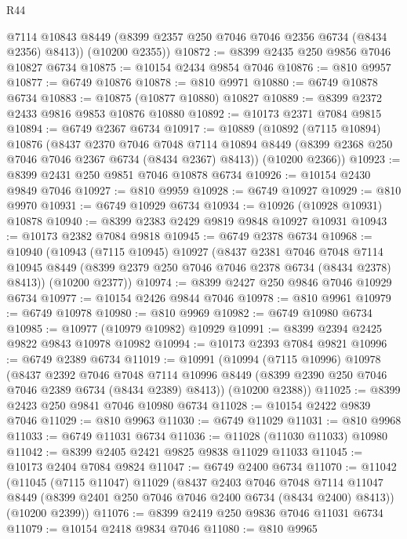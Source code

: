 \begin{lexlean}{R44}
\begin{coremodule}
{        @7114
        @10843
        @8449
        (@8399 @2357 @250 @7046 @7046 @2356 @6734 (@8434 @2356) @8413))
      (@10200 @2355))
@10872 := @8399 @2435 @250 @9856 @7046 @10827 @6734
@10875 := @10154 @2434 @9854 @7046
@10876 := @810 @9957
@10877 := @6749 @10876
@10878 := @810 @9971
@10880 := @6749 @10878 @6734
@10883 := @10875 (@10877 @10880) @10827
@10889 := @8399 @2372 @2433 @9816 @9853 @10876 @10880
@10892 := @10173 @2371 @7084 @9815
@10894 := @6749 @2367 @6734
@10917 := @10889
    (@10892
      (@7115 @10894)
      @10876
      (@8437
        @2370
        @7046
        @7048
        @7114
        @10894
        @8449
        (@8399 @2368 @250 @7046 @7046 @2367 @6734 (@8434 @2367) @8413))
      (@10200 @2366))
@10923 := @8399 @2431 @250 @9851 @7046 @10878 @6734
@10926 := @10154 @2430 @9849 @7046
@10927 := @810 @9959
@10928 := @6749 @10927
@10929 := @810 @9970
@10931 := @6749 @10929 @6734
@10934 := @10926 (@10928 @10931) @10878
@10940 := @8399 @2383 @2429 @9819 @9848 @10927 @10931
@10943 := @10173 @2382 @7084 @9818
@10945 := @6749 @2378 @6734
@10968 := @10940
    (@10943
      (@7115 @10945)
      @10927
      (@8437
        @2381
        @7046
        @7048
        @7114
        @10945
        @8449
        (@8399 @2379 @250 @7046 @7046 @2378 @6734 (@8434 @2378) @8413))
      (@10200 @2377))
@10974 := @8399 @2427 @250 @9846 @7046 @10929 @6734
@10977 := @10154 @2426 @9844 @7046
@10978 := @810 @9961
@10979 := @6749 @10978
@10980 := @810 @9969
@10982 := @6749 @10980 @6734
@10985 := @10977 (@10979 @10982) @10929
@10991 := @8399 @2394 @2425 @9822 @9843 @10978 @10982
@10994 := @10173 @2393 @7084 @9821
@10996 := @6749 @2389 @6734
@11019 := @10991
    (@10994
      (@7115 @10996)
      @10978
      (@8437
        @2392
        @7046
        @7048
        @7114
        @10996
        @8449
        (@8399 @2390 @250 @7046 @7046 @2389 @6734 (@8434 @2389) @8413))
      (@10200 @2388))
@11025 := @8399 @2423 @250 @9841 @7046 @10980 @6734
@11028 := @10154 @2422 @9839 @7046
@11029 := @810 @9963
@11030 := @6749 @11029
@11031 := @810 @9968
@11033 := @6749 @11031 @6734
@11036 := @11028 (@11030 @11033) @10980
@11042 := @8399 @2405 @2421 @9825 @9838 @11029 @11033
@11045 := @10173 @2404 @7084 @9824
@11047 := @6749 @2400 @6734
@11070 := @11042
    (@11045
      (@7115 @11047)
      @11029
      (@8437
        @2403
        @7046
        @7048
        @7114
        @11047
        @8449
        (@8399 @2401 @250 @7046 @7046 @2400 @6734 (@8434 @2400) @8413))
      (@10200 @2399))
@11076 := @8399 @2419 @250 @9836 @7046 @11031 @6734
@11079 := @10154 @2418 @9834 @7046
@11080 := @810 @9965
}
\end{coremodule}
\end{lexlean}
